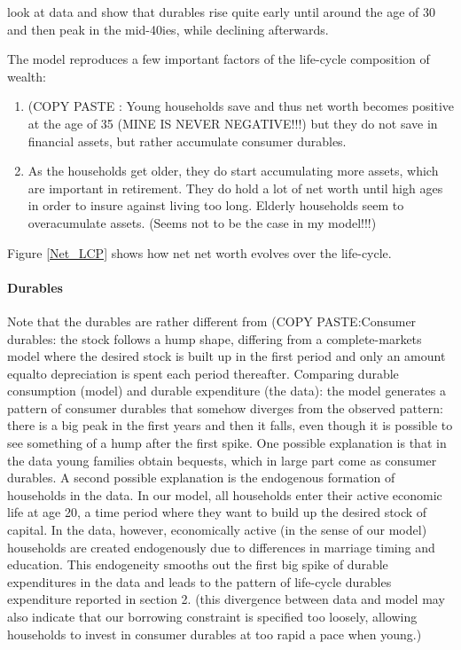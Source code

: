 \documentclass[a4paper,12pt]{article}
\begin{document}
\citep{FV&K2011} look at data and show that durables rise quite early until around the age of 30 and then peak in the mid-40ies, while declining afterwards. 

The model reproduces a few important factors of the life-cycle composition of wealth:
\begin{enumerate}
\item (COPY PASTE \citep{FV&K2011}: Young households save and thus net worth becomes positive at the age of 35 (MINE IS NEVER NEGATIVE!!!) but they do not save in financial assets, but rather accumulate consumer durables.
\item As the households get older, they do start accumulating more assets, which are important in retirement. They do hold a lot of net worth until high ages in order to insure against living too long. 
Elderly households seem to overacumulate assets. (Seems not to be the case in my model!!!)
\end{enumerate}

Figure \ref{Net_LCP} shows how net net worth evolves over the life-cycle. 


\paragraph{Durables}
Note that the durables are rather different from \citep{FV&K2011} (COPY PASTE:Consumer durables: the stock follows a hump shape, differing from a complete-markets model where the desired stock is built up in the first period and only an amount equalto depreciation is spent each period thereafter. 
Comparing durable consumption (model) and durable expenditure (the data): the model generates a pattern of consumer durables that somehow diverges from the observed pattern: there is a big peak in the first years and then it falls, even though it is possible to see something of a hump after the first spike. 
One possible explanation is that in the data young families obtain bequests, which in large part come as consumer durables. 
A second possible explanation is the endogenous formation of households in the data. In our model, all households enter their active economic life at age 20, a time period where they want to build up the desired stock of capital. In the data, however, economically active (in the sense of our model) households are created endogenously due to differences in marriage timing and education. This endogeneity smooths out the first big spike of durable expenditures in the data and leads to the pattern of life-cycle durables expenditure reported in section 2. (this divergence between data and model may also indicate that our borrowing constraint is specified too loosely, allowing households to invest in consumer durables at too rapid a pace when young.)
\end{document}

